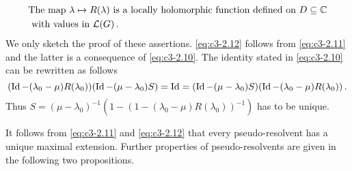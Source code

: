 \begin{equation}\label{eq:c3-2.12}
	\begin{aligned}
	&\text{The map $\lambda \mapsto R(\lambda)$ is a locally holomorphic function defined on  $D \subseteq \mathbb{C} $}\\ 
	&\text{ with values in  $\mathcal{L}(G)$}\,.
	\end{aligned}
\end{equation}
We only sketch the proof of these assertions. \eqref{eq:c3-2.12} follows from \eqref{eq:c3-2.11} and the latter is a consequence of \eqref{eq:c3-2.10}.
The identity stated in \eqref{eq:c3-2.10} can be rewritten as follows
\[
(\operatorname{Id}-(\lambda_{0}-\mu)R(\lambda_{0}))(\operatorname{Id}-(\mu-\lambda_{0})S) = \operatorname{Id} = (\operatorname{Id}-(\mu-\lambda_{0})S)(\operatorname{Id}-(\lambda_{0}-\mu)R(\lambda_{0}))\,.
\]
Thus $S = (\mu-\lambda_{0})^{-1}(1 - (1-(\lambda_{0}-\mu)R(\lambda_{0}))^{-1})$ has to be unique.

It follows from \eqref{eq:c3-2.11} and \eqref{eq:c3-2.12} that every pseudo-resolvent has a unique maximal extension.
Further properties of pseudo-resolvents are given in the following two propositions.


